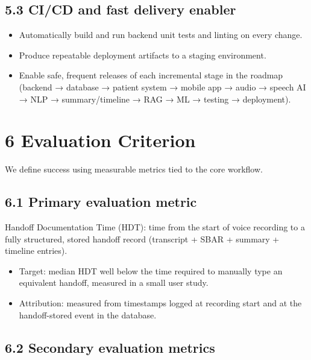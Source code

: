 \documentclass[
]{article}
\begin{document}
\subsection{5.3 CI/CD and fast delivery
enabler}\label{cicd-and-fast-delivery-enabler}

\begin{itemize}
\item
  Automatically build and run backend unit tests and linting on every
  change.
\item
  Produce repeatable deployment artifacts to a staging environment.
\item
  Enable safe, frequent releases of each incremental stage in the
  roadmap (backend → database → patient system → mobile app → audio →
  speech AI → NLP → summary/timeline → RAG → ML → testing → deployment).
\end{itemize}

\section{6 Evaluation Criterion}\label{evaluation-criterion}

We define success using measurable metrics tied to the core workflow.

\subsection{6.1 Primary evaluation
metric}\label{primary-evaluation-metric}

Handoff Documentation Time (HDT): time from the start of voice recording
to a fully structured, stored handoff record (transcript + SBAR +
summary + timeline entries).

\begin{itemize}
\item
  Target: median HDT well below the time required to manually type an
  equivalent handoff, measured in a small user study.
\item
  Attribution: measured from timestamps logged at recording start and at
  the handoff-stored event in the database.
\end{itemize}

\subsection{6.2 Secondary evaluation
metrics}\label{secondary-evaluation-metrics}
\end{document}
